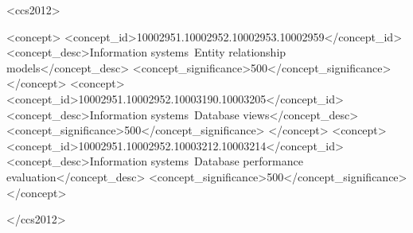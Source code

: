 \documentclass[sigconf]{acmart}
\begin{document}
\begin{abstract}
Normalization reduces the degree of data redundancy and update inefficiency that instances of a database schema can exhibit. Denormalization undoes some of these effects for the purpose of evaluating frequent queries faster. We establish an algebraic framework for denormalization using Entity/Relationship (E/R) modelling. Different from any previous work, our framework provides a conceptual understanding for the degree of data redundancy that E/R diagrams entail, which is independent from any logical and physical data models derived subsequently. Intuitively, links of an E/R diagram remove data redundancy while joining object types they link re-introduces data redundancy. For a given E/R diagram, generating denormalized E/R diagrams by joining object types via their links is shown to form a Boolean algebra. Its operations of meet, join, and negation are associated with the selection of views for a given workload of join queries. We conduct extensive experiments on our running example to illustrate our framework at an operational level. In addition, extensive experiments on TPC-H highlight how the framework performs on a well-known benchmark. This illustrates what conceptual insights can be derived from our framework and how they need to be complemented by practical considerations when moving to an operational workload.
\end{abstract}


\begin{CCSXML}
<ccs2012>

    <concept>
        <concept_id>10002951.10002952.10002953.10002959</concept_id>
        <concept_desc>Information systems~Entity relationship models</concept_desc>
        <concept_significance>500</concept_significance>
    </concept>
    <concept>
        <concept_id>10002951.10002952.10003190.10003205</concept_id>
        <concept_desc>Information systems~Database views</concept_desc>
        <concept_significance>500</concept_significance>
    </concept>
    <concept>
        <concept_id>10002951.10002952.10003212.10003214</concept_id>
        <concept_desc>Information systems~Database performance evaluation</concept_desc>
        <concept_significance>500</concept_significance>
    </concept>

</ccs2012>
\end{CCSXML}

\end{document}
